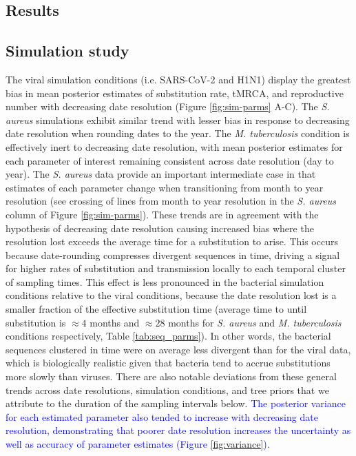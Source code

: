 \documentclass[12pt]{article}
\begin{document}
\begin{spacing}{2}
\section*{Results}
\subsection*{Simulation study} %
The viral simulation conditions (i.e. SARS-CoV-2 and H1N1) display the greatest bias in mean posterior estimates of substitution rate, tMRCA, and reproductive number with decreasing date resolution (Figure \ref{fig:sim-parms} A-C). The \textit{S. aureus} simulations exhibit  similar trend with lesser bias in response to decreasing date resolution when rounding dates to the year. The \textit{M. tuberculosis} condition is effectively inert to decreasing date resolution, with mean posterior estimates for each parameter of interest remaining consistent across date resolution (day to year). The \textit{S. aureus} data provide an important intermediate case in that estimates of each parameter change when transitioning from month to year resolution (see crossing of lines from month to year resolution in the \textit{S. aureus} column of Figure \ref{fig:sim-parms}). These trends are in agreement with the hypothesis of decreasing date resolution causing increased bias where the resolution lost exceeds the average time for a substitution to arise. This occurs because date-rounding compresses divergent sequences in time, driving a signal for higher rates of substitution and transmission locally to each temporal cluster of sampling times.  This effect is less pronounced in the bacterial simulation conditions relative to the viral conditions, because the date resolution lost is a smaller fraction of the effective substitution time (average time to until substitution is $\approx4$ months and $\approx28$ months for \textit{S. aureus} and \textit{M. tuberculosis} conditions respectively, Table \ref{tab:seq_parms}). In other words, the bacterial sequences clustered in time were on average less divergent than for the viral data, which is biologically realistic given that bacteria tend to accrue substitutions more slowly than viruses. There are also notable deviations from these general trends across date resolutions, simulation conditions, and tree priors that we attribute to the duration of the sampling intervals below. \textcolor{blue}{The posterior variance for each estimated parameter also tended to increase with decreasing date resolution, demonstrating that poorer date resolution increases the uncertainty as well as accuracy of parameter estimates (Figure \ref{fig:variance}).}


\end{spacing}
\end{document}
